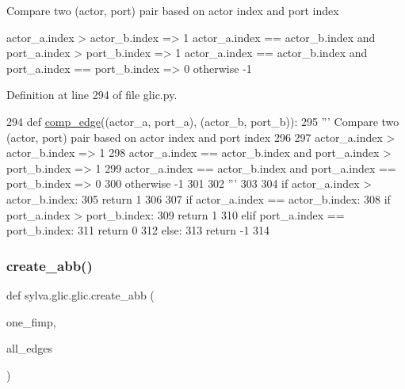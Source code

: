 \begin{DoxyVerb}Compare two (actor, port) pair based on actor index and port index

  actor_a.index > actor_b.index => 1
  actor_a.index == actor_b.index and port_a.index > port_b.index => 1
  actor_a.index == actor_b.index and port_a.index == port_b.index => 0
  otherwise -1\end{DoxyVerb}
 

Definition at line 294 of file glic.\+py.


\begin{DoxyCode}
294   \textcolor{keyword}{def }\hyperlink{namespacesylva_1_1glic_1_1glic_aa441c66a03eed575ba427151f3567a0e}{comp\_edge}((actor\_a, port\_a), (actor\_b, port\_b)):
295     \textcolor{stringliteral}{''' Compare two (actor, port) pair based on actor index and port index}
296 \textcolor{stringliteral}{}
297 \textcolor{stringliteral}{      actor\_a.index > actor\_b.index => 1}
298 \textcolor{stringliteral}{      actor\_a.index == actor\_b.index and port\_a.index > port\_b.index => 1}
299 \textcolor{stringliteral}{      actor\_a.index == actor\_b.index and port\_a.index == port\_b.index => 0}
300 \textcolor{stringliteral}{      otherwise -1}
301 \textcolor{stringliteral}{}
302 \textcolor{stringliteral}{    '''}
303 
304     \textcolor{keywordflow}{if} actor\_a.index > actor\_b.index:
305       \textcolor{keywordflow}{return} 1
306 
307     \textcolor{keywordflow}{if} actor\_a.index == actor\_b.index:
308       \textcolor{keywordflow}{if} port\_a.index > port\_b.index:
309         \textcolor{keywordflow}{return} 1
310       \textcolor{keywordflow}{elif} port\_a.index == port\_b.index:
311         \textcolor{keywordflow}{return} 0
312       \textcolor{keywordflow}{else}:
313         \textcolor{keywordflow}{return} -1
314 
\end{DoxyCode}
\mbox{\label{namespacesylva_1_1glic_1_1glic_a3a984424c11a0b4b6ac8890135ccbfe9}} 
\subsubsection{\texorpdfstring{create\+\_\+abb()}{create\_abb()}}
{\footnotesize\ttfamily def sylva.\+glic.\+glic.\+create\+\_\+abb (\begin{DoxyParamCaption}\item[{}]{one\+\_\+fimp,  }\item[{}]{all\+\_\+edges }\end{DoxyParamCaption})}



